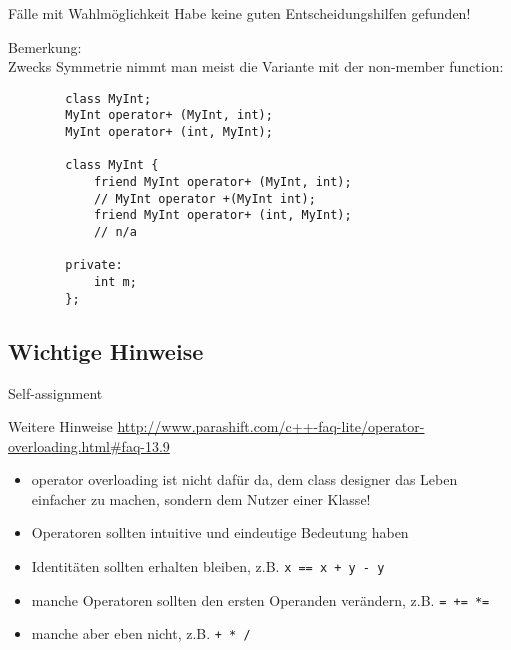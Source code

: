 \begin{frame}[fragile]{Fälle mit Wahlmöglichkeit}
	Habe keine guten Entscheidungshilfen gefunden!
	
	\vspace{1em}
	
	Bemerkung:\\
	Zwecks Symmetrie nimmt man meist die Variante mit der non-member function:
	\begin{lstlisting}
		class MyInt;
		MyInt operator+ (MyInt, int);
		MyInt operator+ (int, MyInt);
		
		class MyInt {
		    friend MyInt operator+ (MyInt, int);
		    // MyInt operator +(MyInt int);
		    friend MyInt operator+ (int, MyInt);
		    // n/a
		    
		private:
		    int m;
		};
	\end{lstlisting}
\end{frame}




\subsection{Wichtige Hinweise}

\begin{frame}[fragile]{Self-assignment}
	\onslide*<+>
	{
		
	}
		
	\onslide*<+>
	{
		
	}
\end{frame}

\begin{frame}[fragile]{Weitere Hinweise}
	\url{http://www.parashift.com/c++-faq-lite/operator-overloading.html#faq-13.9}
	
	\vspace{2em}
	
	\begin{itemize}[<+->]
		\item operator overloading ist nicht dafür da, dem class designer das Leben einfacher zu machen, sondern dem Nutzer einer Klasse!
		\item Operatoren sollten intuitive und eindeutige Bedeutung haben
		\item Identitäten sollten erhalten bleiben, z.B. \verb|x == x + y - y|
		\item manche Operatoren sollten den ersten Operanden verändern, z.B. \verb|= += *=|
		\item manche aber eben nicht, z.B. \verb|+ * /|
	\end{itemize}
\end{frame}
